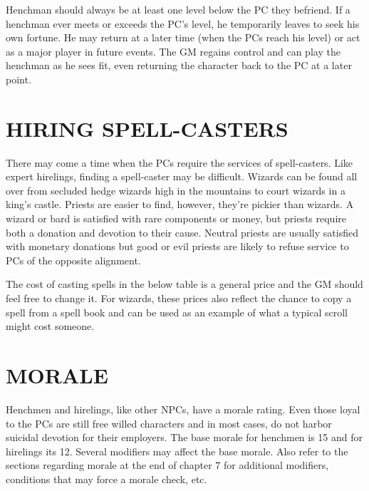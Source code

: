 \begin{multicols}{2}
Henchman should always be at least one level below the PC they befriend.  If a henchman ever meets or exceeds the PC's level, he temporarily leaves to seek his own fortune.  He may return at a later time (when the PCs reach his level) or act as a major player in future events.  The GM regains control and can play the henchman as he sees fit, even returning the character back to the PC at a later point.

\section{HIRING SPELL-CASTERS}

There may come a time when the PCs require the services of spell-casters.  Like expert hirelings, finding a spell-caster may be difficult.  Wizards can be found all over from secluded hedge wizards high in the mountains to court wizards in a king's castle.  Priests are easier to find, however, they're pickier than wizards.  A wizard or bard is satisfied with rare components or money, but priests require both a donation and devotion to their cause.  Neutral priests are usually satisfied with monetary donations but good or evil priests are likely to refuse service to PCs of the opposite alignment.

The cost of casting spells in the below table is a general price and the GM should feel free to change it.  For wizards, these prices also reflect the chance to copy a spell from a spell book and can be used as an example of what a typical scroll might cost someone.

\section{MORALE}

Henchmen and hirelings, like other NPCs, have a morale rating.  Even those loyal to the PCs are still free willed characters and in most cases, do not harbor suicidal devotion for their employers.  The base morale for henchmen is 15 and for hirelings its 12.  Several modifiers may affect the base morale.  Also refer to the sections regarding morale at the end of chapter 7 for additional modifiers, conditions that may force a morale check, etc.

\noindent
\begin{minipage}{\columnwidth}


\end{minipage}
\end{multicols}
